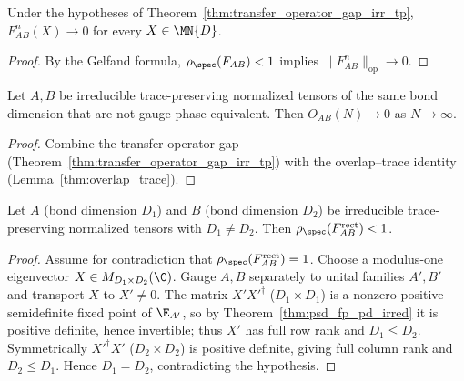\begin{theorem}%
    \label{thm:transfer_pow_zero_irr_tp}
    \leanok
    Under the hypotheses of
    Theorem~\ref{thm:transfer_operator_gap_irr_tp},
    $F_{AB}^n(X) \to 0$ for every $X \in \MN{D}$.
\end{theorem}

\begin{proof}\leanok{}
    By the Gelfand formula,
    $\rho_{\spec}(F_{AB}) < 1$ implies $\|F_{AB}^n\|_{\mathrm{op}} \to 0$.
\end{proof}

\begin{theorem}%
    \label{thm:overlap_decay_irr_tp}
    \leanok
    Let $A, B$ be irreducible trace-preserving normalized tensors of
    the same bond dimension that are not gauge-phase equivalent.
    Then $O_{AB}(N) \to 0$ as $N \to \infty$.
\end{theorem}

\begin{proof}\leanok{}
    Combine the transfer-operator gap
    (Theorem~\ref{thm:transfer_operator_gap_irr_tp})
    with the overlap--trace identity
    (Lemma~\ref{thm:overlap_trace}).
\end{proof}

\begin{theorem}%
    \label{thm:transfer_operator_gap_rect_irr_tp}
    \leanok
    Let $A$ (bond dimension $D_1$) and $B$ (bond dimension $D_2$) be
    irreducible trace-preserving normalized tensors with
    $D_1 \neq D_2$.
    Then $\rho_{\spec}(F_{AB}^{\mathrm{rect}}) < 1$.
\end{theorem}

\begin{proof}
    \leanok
    Assume for contradiction that $\rho_{\spec}(F_{AB}^{\mathrm{rect}}) = 1$.
    Choose a modulus-one eigenvector $X \in M_{D_1 \times D_2}(\C)$.
    Gauge $A,B$ separately to unital families $A',B'$ and transport $X$ to
    $X'\neq 0$.
    The matrix $X'X'^\dagger$ ($D_1 \times D_1$) is a nonzero
    positive-semidefinite fixed point of $\E_{A'}$, so by
    Theorem~\ref{thm:psd_fp_pd_irred} it is positive definite, hence invertible;
    thus $X'$ has full row rank and $D_1 \le D_2$. Symmetrically
    $X'^\dagger X'$ ($D_2 \times D_2$) is positive definite, giving full column
    rank and $D_2 \le D_1$. Hence $D_1=D_2$, contradicting the hypothesis.
\end{proof}


